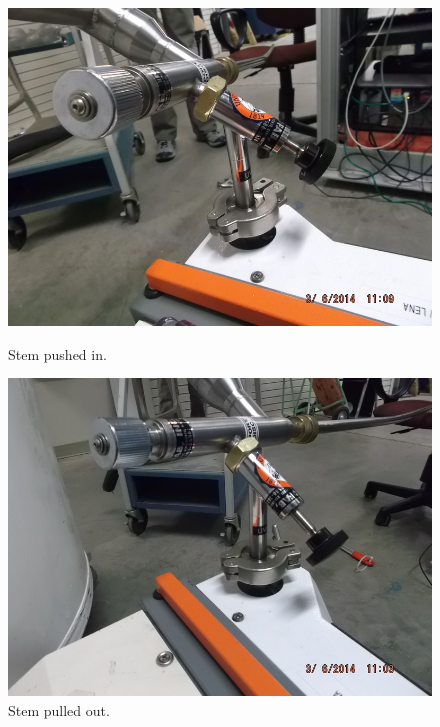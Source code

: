 \begin{figure}[!htbp]
\begin{minipage}{.45\textwidth}
 \label{fig:cf-adapter-on-tl}
 \end{minipage}
 \quad
 \begin{minipage}{.45\textwidth}
 \includegraphics[width=\textwidth]{./img/cf-adapter-pushedin.JPG}
 \caption{Stem pushed in.}
 \label{fig:cf-adapter-pushedin}
 \end{minipage}
 \quad
 \begin{minipage}{.45\textwidth}
  \includegraphics[width=\textwidth]{./img/cf-adapter-pulledout.JPG}
 \caption{Stem pulled out.}
 \label{fig:cf-adapter-pulledout}
 \end{minipage}
 \quad
 \end{figure}


